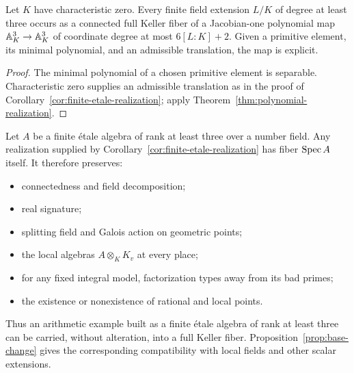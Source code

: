 \begin{corollary}\label{cor:fields}
Let \(K\) have characteristic zero.  Every finite field extension \(L/K\)
of degree at least three
occurs as a connected full Keller fiber of a Jacobian-one polynomial map
\(\mathbb A^3_K\to\mathbb A^3_K\) of coordinate degree at most \(6[L:K]+2\).
Given a primitive element, its minimal polynomial, and an admissible
translation, the map is explicit.
\end{corollary}

\begin{proof}
The minimal polynomial of a chosen primitive element is separable.
Characteristic zero supplies an admissible translation as in the proof of
Corollary~\ref{cor:finite-etale-realization}; apply
Theorem~\ref{thm:polynomial-realization}.
\end{proof}

\begin{corollary}\label{cor:transfer}
Let \(A\) be a finite \'etale algebra of rank at least three over a number
field.  Any realization supplied by
Corollary~\ref{cor:finite-etale-realization} has fiber \(\operatorname{Spec} A\) itself.
It therefore preserves:
\begin{itemize}
\item connectedness and field decomposition;
\item real signature;
\item splitting field and Galois action on geometric points;
\item the local algebras \(A\otimes_KK_v\) at every place;
\item for any fixed integral model, factorization types away from its bad primes;
\item the existence or nonexistence of rational and local points.
\end{itemize}
Thus an arithmetic example built as a finite \'etale algebra of rank at least
three can be carried, without alteration, into a full Keller fiber.
Proposition~\ref{prop:base-change} gives the corresponding compatibility with
local fields and other scalar extensions.
\end{corollary}
